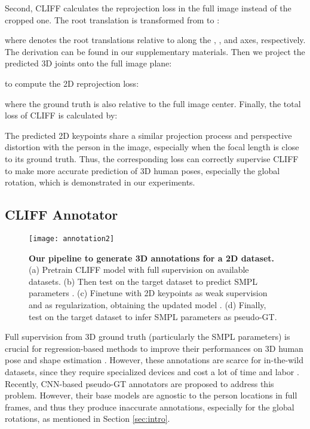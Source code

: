 \documentclass[runningheads]{llncs}
\begin{document}
Second, CLIFF calculates the reprojection loss in the full image instead of the cropped one.
The root translation is transformed from  to :

where  denotes the root translations relative to  along the , , and  axes, respectively. The derivation can be found in our supplementary materials.
Then we project the predicted 3D joints onto the full image plane:

to compute the 2D reprojection loss:

where the ground truth  is also relative to the full image center.
Finally, the total loss of CLIFF is calculated by:


The predicted 2D keypoints  share a similar projection process and perspective distortion with the person in the image, especially when the focal length  is close to its ground truth. Thus, the corresponding loss  can correctly supervise CLIFF to make more accurate prediction of 3D human poses, especially the global rotation, which is demonstrated in our experiments.

\subsection{CLIFF Annotator}\label{sec:anno}

\begin{figure}[t]
	\centering
	\texttt{[image: annotation2]}
	\caption {\textbf{Our pipeline to generate 3D annotations for a 2D dataset.} (a) Pretrain CLIFF model  with full supervision on available datasets. (b) Then test  on the target dataset to predict SMPL parameters . (c) Finetune  with 2D keypoints as weak supervision and  as regularization, obtaining the updated model . (d) Finally, test  on the target dataset to infer SMPL parameters as pseudo-GT.}
	\label{fig:annotation}
\end{figure}

Full supervision from 3D ground truth (particularly the SMPL parameters) is crucial for regression-based methods to improve their performances on 3D human pose and shape estimation \cite{kolotouros2019learning}. However, these annotations are scarce for in-the-wild datasets, since they require specialized devices and cost a lot of time and labor \cite{ionescu2013human3,von2018recovering}. Recently, CNN-based pseudo-GT annotators \cite{kolotouros2019learning,joo2021exemplar,moon2020neuralannot} are proposed to address this problem. However, their base models are agnostic to the person locations in full frames, and thus they produce inaccurate annotations, especially for the global rotations, as mentioned in Section \ref{sec:intro}.
\end{document}

